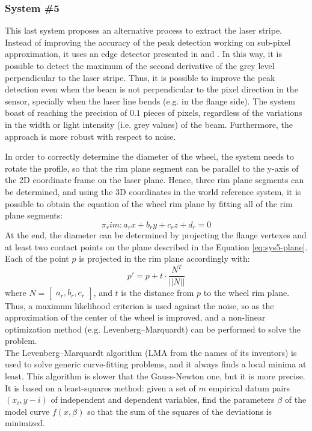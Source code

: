 \subsubsection{System \#5} %
This last system proposes an alternative process to extract the laser stripe. Instead of improving the accuracy of the peak detection working on sub-pixel approximation, it uses an edge detector presented in \cite{chen2013efficient} and \cite{659930}. In this way, it is possible to detect the maximum of the second derivative of the grey level perpendicular to the laser stripe. Thus, it is possible to improve the peak detection even when the beam is not perpendicular to the pixel direction in the sensor, specially when the laser line bends (e.g. in the flange side). The system boast of reaching the precision of $0.1$ pieces of pixels, regardless of the variations in the width or light intensity (i.e. grey values) of the beam. Furthermore, the approach is more robust with respect to noise.

In order to correctly determine the diameter of the wheel, the system needs to rotate the profile, so that the rim plane segment can be parallel to the y-axis of the 2D coordinate frame on the laser plane. Hence, three rim plane segments can be determined, and using the 3D coordinates in the world reference system, it is possible to obtain the equation of the wheel rim plane by fitting all of the rim plane segments:
  \begin{equation}
    \pi_rim : a_rx + b_ry + c_rz + d_r = 0
    \label{eq:sys5-plane}
  \end{equation}
At the end, the diameter can be determined by projecting the flange vertexes and at least two contact points on the plane described in the Equation \ref{eq:sys5-plane}. Each of the point $p$ is projected in the rim plane accordingly with:
  \begin{equation*}
    p' = p + t\cdot\frac{N^T}{||N||}
  \end{equation*}
where $N = \begin{bmatrix} a_r, b_r, c_r \end{bmatrix}$, and $t$ is the distance from $p$ to the wheel rim plane. Thus, a maximum likelihood criterion is used against the noise, so as the approximation of the center of the wheel is improved, and a non-linear optimization method (e.g. Levenberg–Marquardt) can be performed to solve the problem. \\
The Levenberg–Marquardt algorithm (\acs{LMA} from the names of its inventors) is used to solve generic curve-fitting problems, and it always finds a local minima at least. This algorithm is slower that the Gauss-Newton one, but it is more precise. It is based on a least-squares method: given a set of $m$ empirical datum pairs $\left( x_i, y-i \right)$ of independent and dependent variables, find the parameters $\beta$ of the model curve $f(x,\beta)$ so that the sum of the squares of the deviations is minimized. \\

